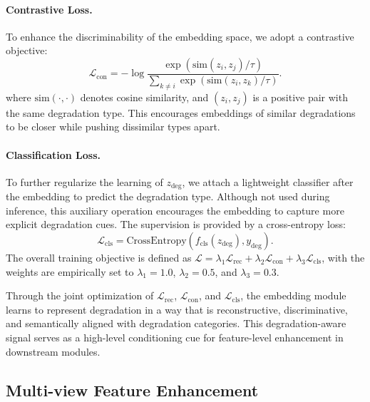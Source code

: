 \documentclass[letterpaper]{article} %
\begin{document}
\paragraph{Contrastive Loss.} To enhance the discriminability of the embedding space, we adopt a contrastive objective:
\begin{equation}
    \mathcal{L}_{\mathrm{con}} = -\log \frac{\exp(\mathrm{sim}(z_i, z_j)/\tau)}{\sum_{k \ne i} \exp(\mathrm{sim}(z_i, z_k)/\tau)}.
\end{equation}
where $\mathrm{sim}(\cdot,\cdot)$ denotes cosine similarity, and $(z_i, z_j)$ is a positive pair with the same degradation type. This encourages embeddings of similar degradations to be closer while pushing dissimilar types apart.

\paragraph{Classification Loss.} To further regularize the learning of $z_{\mathrm{deg}}$, we attach a lightweight classifier after the embedding to predict the degradation type. Although not used during inference, this auxiliary operation encourages the embedding to capture more explicit degradation cues. The supervision is provided by a cross-entropy loss:
\begin{equation}
\mathcal{L}_{\mathrm{cls}} = \mathrm{CrossEntropy}(f_{\mathrm{cls}}(z_{\mathrm{deg}}), y_{\mathrm{deg}}).
\end{equation}
The overall training objective is defined as $\mathcal{L} = \lambda_1 \mathcal{L}_{\mathrm{rec}} + \lambda_2 \mathcal{L}_{\mathrm{con}} + \lambda_3 \mathcal{L}_{\mathrm{cls}}$, with the weights are empirically set to $\lambda_1 = 1.0$, $\lambda_2 = 0.5$, and $\lambda_3 = 0.3$.



Through the joint optimization of $\mathcal{L}_{\mathrm{rec}}$, $\mathcal{L}_{\mathrm{con}}$, and $\mathcal{L}_{\mathrm{cls}}$, the embedding module learns to represent degradation in a way that is reconstructive, discriminative, and semantically aligned with degradation categories. This degradation-aware signal serves as a high-level conditioning cue for feature-level enhancement in downstream modules.

\subsection{Multi-view Feature Enhancement}
\end{document}
